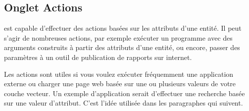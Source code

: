 \subsection{Onglet Actions}\label{label_actions}

\qg est capable d'effectuer des actions basées sur les attributs d'une entité. Il peut s'agir de nombreuses actions, par exemple exécuter un programme avec des arguments construits à partir des attributs d'une entité, ou encore, passer des paramètres à un outil de publication de rapports sur internet.

Les actions sont utiles si vous voulez exécuter fréquemment une application externe ou charger une page web basée sur une ou plusieurs valeurs de votre couche vecteur. Un exemple d'application serait d'effectuer une recherche basée sur une valeur d'attribut. C'est l'idée utilisée dans les paragraphes qui suivent.


